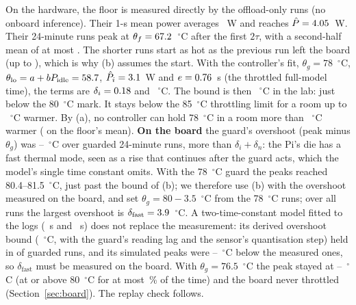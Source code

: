 \documentclass[conference]{IEEEtran}
\begin{document}
On the hardware, the floor is measured directly by the \TgFloorRuns{} offload-only runs (no onboard inference). Their
1-s mean power averages \TgFloorPower~W and reaches $\hat P = 4.05$~W. Their \TgFloorLongRuns{} 24-minute runs
peak at $\theta_f = 67.2$~$^\circ$C after the first $2\tau$, with a second-half mean of at most \TgFloorMean.
The shorter runs start as hot as the previous run left the board (up to \TgFloorMaxAny), which is why (b) assumes the
start. With the controller's fit, $\theta_g = 78$~$^\circ$C, $\theta_{\mathrm{lo}} = a + bP_{\mathrm{idle}} =
58.7$, $\hat P_i = 3.1$~W and $e = 0.76$~s (the throttled full-model time), the terms are
$\delta_i = 0.18$ and \TgDn~$^\circ$C. The bound is then \TgBoundLab~$^\circ$C in the lab: just below the 80~$^\circ$C
mark. It stays below the 85~$^\circ$C throttling limit for a room up to \TgMarginThrottle~$^\circ$C warmer. By (a), no
controller can hold 78~$^\circ$C in a room more than \TgConverseMax~$^\circ$C warmer (\TgConverseMean{} on the
floor's mean). \textbf{On the board} the guard's overshoot (peak minus $\theta_g$) was \BdDeltaFastMin--\BdDeltaFast~$^\circ$C
over \BdGuardedRuns{} guarded 24-minute runs, more than $\delta_i + \delta_n$: the Pi's die has a fast thermal mode, seen
as a rise that continues after the guard acts, which the model's single time constant omits. With the 78~$^\circ$C guard
the peaks reached 80.4--81.5~$^\circ$C, just past the bound of (b); we therefore use (b) with the overshoot measured on
the board, and set $\theta_g = 80 - 3.5$~$^\circ$C from the 78~$^\circ$C runs; over all \BdGuardedRuns{} runs the
largest overshoot is $\delta_{\mathrm{fast}} = 3.9$~$^\circ$C. A two-time-constant model fitted to the logs
(\TmTauF~s and \TmTauS~s) does not replace the measurement: its derived overshoot bound (\TmBound~$^\circ$C, with the
guard's reading lag and the sensor's quantisation step) held in \TmHeld{} of \TmRuns{} guarded runs, and its simulated peaks
were \TmLowMin--\TmLowMax~$^\circ$C below the measured ones, so $\delta_{\mathrm{fast}}$ must be measured on the board. With $\theta_g = 76.5$~$^\circ$C the peak
stayed at \BdGuardPeakMin--\BdGuardPeakMax~$^\circ$C (at or above 80~$^\circ$C for at most \BdGuardHotMax\,\% of the
time) and the board never throttled (Section~\ref{sec:board}). The replay check follows.
\end{document}
